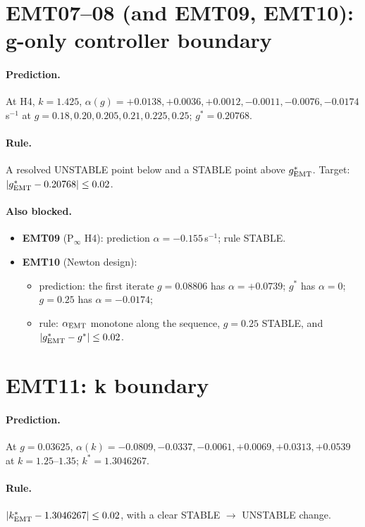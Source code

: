 \documentclass[10pt,a4paper]{article}
\newcommand{\sinv}{\,s$^{-1}$}
\begin{document}
\section{EMT07--08 (and EMT09, EMT10): g-only controller boundary}

\paragraph{Prediction.} At H4, $k=1.425$, $\alpha(g)=+0.0138, +0.0036,
+0.0012, -0.0011, -0.0076, -0.0174$\sinv{} at $g=0.18, 0.20, 0.205, 0.21,
0.225, 0.25$; $g^*=0.20768$.

\paragraph{Rule.} A resolved UNSTABLE point below and a STABLE point above
$g^*_{\rm EMT}$. Target: $|g^*_{\rm EMT}-0.20768|\le0.02$.

\paragraph{Also blocked.}
\begin{itemize}
\item \textbf{EMT09} (P$_\infty$ H4): prediction $\alpha=-0.155$\sinv; rule
  STABLE.
\item \textbf{EMT10} (Newton design):
  \begin{itemize}
  \item prediction: the first iterate $g=0.08806$ has $\alpha=+0.0739$;
    $g^*$ has $\alpha=0$; $g=0.25$ has $\alpha=-0.0174$;
  \item rule: $\alpha_{\rm EMT}$ monotone along the sequence, $g=0.25$ STABLE,
    and $|g^*_{\rm EMT}-g^*|\le0.02$.
  \end{itemize}
\end{itemize}

\section{EMT11: k boundary}

\paragraph{Prediction.} At $g=0.03625$, $\alpha(k)=-0.0809, -0.0337, -0.0061,
+0.0069, +0.0313, +0.0539$ at $k=1.25$--$1.35$; $k^*=1.3046267$.

\paragraph{Rule.} $|k^*_{\rm EMT}-1.3046267|\le0.02$, with a clear STABLE
$\to$ UNSTABLE change.
\end{document}
